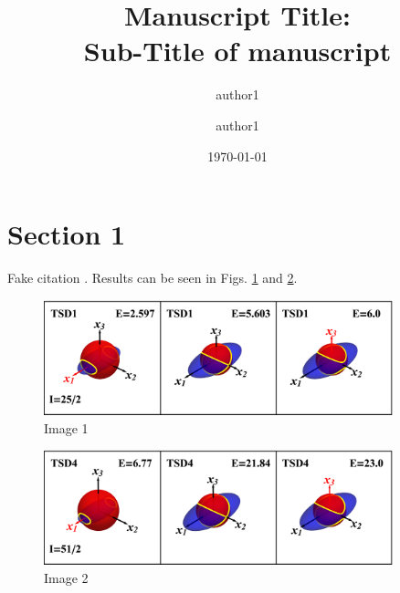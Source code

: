 \documentclass[%
preprint,
 amsmath,
 amssymb,
 aps,
]{revtex4-2}
\begin{document}
\title{Manuscript Title:\\Sub-Title of manuscript }%

\author{author1}%
\author{author1}%
%


\date{\today}

\begin{abstract}
\lipsum[1]
\end{abstract}

\maketitle


\section{Section 1}

\lipsum[1-4] Fake citation \cite{chen2020interpretation}. Results can be seen in Figs. \ref{fig:image-1} and \ref{fig:image-2}.

\begin{figure}
    \centering
    \includegraphics[width=0.9\textwidth]{images/energy_ellipsoids/tsd1_spin1.eps}
    \caption{Image 1}
    \label{fig:image-1}
\end{figure}

\begin{figure}
    \centering
    \includegraphics[width=0.9\textwidth]{images/energy_ellipsoids/tsd4_spin2.eps}
    \caption{Image 2}
    \label{fig:image-2}
\end{figure}
\end{document}
